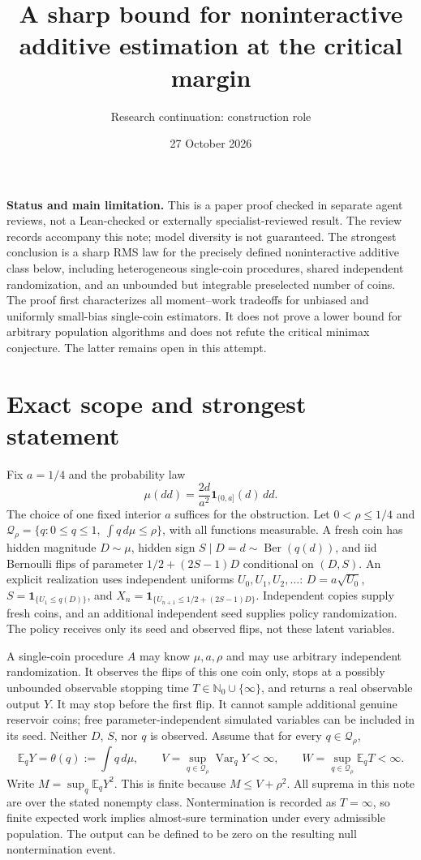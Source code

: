 \documentclass[11pt]{article}
\title{A sharp bound for noninteractive additive estimation at the critical margin}
\author{Research continuation: construction role}
\date{27 October 2026}
\newcommand{\E}{\mathbb E}
\newcommand{\Var}{\operatorname{Var}}
\newcommand{\ind}{\mathbf1}
\begin{document}
\maketitle

\noindent\textbf{Status and main limitation.} This is a paper proof checked in
separate agent reviews, not a Lean-checked or externally specialist-reviewed
result. The review records accompany this note; model diversity is not
guaranteed. The strongest conclusion is a sharp RMS law for the precisely
defined noninteractive additive class below, including heterogeneous
single-coin procedures, shared independent randomization, and an unbounded
but integrable preselected number of coins. The proof first characterizes
all moment--work tradeoffs for unbiased and uniformly small-bias single-coin
estimators. It does not prove a lower
bound for arbitrary population algorithms and does not refute the critical
minimax conjecture. The latter remains open in this attempt.

\section{Exact scope and strongest statement}
Fix $a=1/4$ and the probability law
\[
 \mu(dd)=\frac{2d}{a^2}\ind_{(0,a]}(d)\,dd.
\]
The choice of one fixed interior $a$ suffices for the obstruction. Let
$0<\rho\le1/4$ and
$\mathcal Q_\rho=\{q:0\le q\le1,\ \int q\,d\mu\le\rho\}$,
with all functions measurable. A fresh coin has hidden magnitude $D\sim\mu$,
hidden sign $S\mid D=d\sim\operatorname{Ber}(q(d))$, and iid Bernoulli flips
of parameter $1/2+(2S-1)D$ conditional on $(D,S)$.
An explicit realization uses independent uniforms $U_0,U_1,U_2,\ldots$:
$D=a\sqrt{U_0}$, $S=\ind_{\{U_1\le q(D)\}}$, and
$X_n=\ind_{\{U_{n+1}\le1/2+(2S-1)D\}}$. Independent copies supply fresh
coins, and an additional independent seed supplies policy randomization.
The policy receives only its seed and observed flips, not these latent variables.

A single-coin procedure $A$ may know $\mu,a,\rho$ and may use arbitrary
independent randomization. It observes the flips of this one coin only,
stops at a possibly unbounded observable stopping time
$T\in\mathbb N_0\cup\{\infty\}$, and returns a real
observable output $Y$. It may stop before the first flip. It cannot sample
additional genuine reservoir coins; free parameter-independent simulated
variables can be included in its seed. Neither $D$, $S$, nor $q$ is observed.
Assume that for every $q\in\mathcal Q_\rho$,
\[
 \E_qY=\theta(q):=\int q\,d\mu,
 \qquad
 V=\sup_{q\in\mathcal Q_\rho}\Var_qY<\infty,
 \qquad
 W=\sup_{q\in\mathcal Q_\rho}\E_qT<\infty.
\]
Write $M=\sup_q\E_qY^2$. This is finite because $M\le V+\rho^2$.
All suprema in this note are over the stated nonempty class.
Nontermination is recorded as $T=\infty$, so finite expected work implies
almost-sure termination under every admissible population. The output can be
defined to be zero on the resulting null nontermination event.
\end{document}
